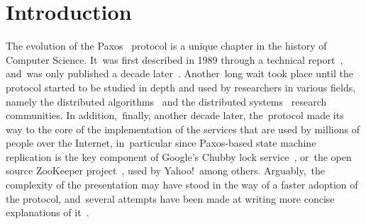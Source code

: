 \documentclass[algorithms,article,accept,moreauthors,pdftex,10pt,a4paper]{Definitions/mdpi}
\begin{document}
%
\section{Introduction}
\label{sec:intro}
%
%
The evolution of the Paxos~\cite{Lam98} protocol is a unique
chapter in the history of Computer Science. It~was first described in
1989 through a technical report~\cite{paxos:tr}, and~was only
published a decade later~\cite{Lam98}. Another~long wait took
place until the protocol started to be studied in depth and used by
researchers in various fields, namely the distributed
algorithms~\cite{DPLL97} and the distributed systems~\cite{petal}
research communities. In addition,~finally, another decade later, the~protocol
made its way to the core of the implementation of the services that
are used by millions of people over the Internet, in~particular since
Paxos-based state machine replication is the key component of Google's
Chubby lock service~\cite{chubby}, or~the open source ZooKeeper
project~\cite{zookeeper}, used by Yahoo!\ among others. Arguably,~the
complexity of the presentation may have stood in the way of a faster
adoption of the protocol, and~several attempts have been made at
writing more concise explanations of
it~\cite{L01,Renesse2011}.
\end{document}
